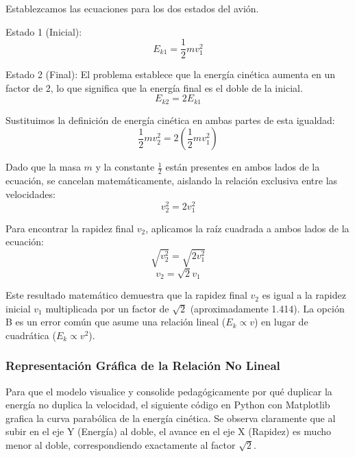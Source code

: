 \documentclass[12pt, a4paper]{article}
\begin{document}
Establezcamos las ecuaciones para los dos estados del avión. 

Estado 1 (Inicial):
\begin{equation}
E_{k1} = \frac{1}{2}mv_1^2
\end{equation}

Estado 2 (Final): El problema establece que la energía cinética aumenta en un factor de 2, lo que significa que la energía final es el doble de la inicial.
\begin{equation}
E_{k2} = 2E_{k1}
\end{equation}

Sustituimos la definición de energía cinética en ambas partes de esta igualdad:
\begin{equation}
\frac{1}{2}mv_2^2 = 2 \left( \frac{1}{2}mv_1^2 \right)
\end{equation}

Dado que la masa $m$ y la constante $\frac{1}{2}$ están presentes en ambos lados de la ecuación, se cancelan matemáticamente, aislando la relación exclusiva entre las velocidades:
\begin{equation}
v_2^2 = 2v_1^2
\end{equation}

Para encontrar la rapidez final $v_2$, aplicamos la raíz cuadrada a ambos lados de la ecuación:
\begin{equation}
\sqrt{v_2^2} = \sqrt{2v_1^2}
\end{equation}
\begin{equation}
v_2 = \sqrt{2}v_1
\end{equation}

Este resultado matemático demuestra que la rapidez final $v_2$ es igual a la rapidez inicial $v_1$ multiplicada por un factor de $\sqrt{2}$ (aproximadamente 1.414). La opción B es un error común que asume una relación lineal ($E_k \propto v$) en lugar de cuadrática ($E_k \propto v^2$).

\subsubsection*{Representación Gráfica de la Relación No Lineal}

Para que el modelo visualice y consolide pedagógicamente por qué duplicar la energía no duplica la velocidad, el siguiente código en Python con Matplotlib grafica la curva parabólica de la energía cinética. Se observa claramente que al subir en el eje Y (Energía) al doble, el avance en el eje X (Rapidez) es mucho menor al doble, correspondiendo exactamente al factor $\sqrt{2}$.
\end{document}
